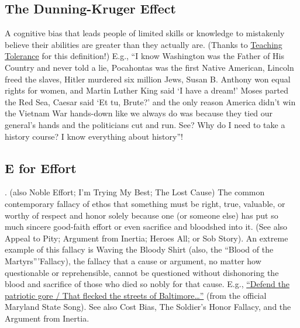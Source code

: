 \documentclass[10pt,a4paper,british]{article}
\begin{document}
\begin{multicols}{2}
    \subsection{The Dunning{-}Kruger Effect} A cognitive bias that leads people of limited skills or knowledge to mistakenly believe their abilities are greater than they actually are. (Thanks to \href{https://www.tolerance.org/magazine/fall-2017/speaking-of-digital-literacy}{Teaching Tolerance} for this definition!)  E.g., ``I know Washington was the Father of His Country and never told a lie, Pocahontas was the first Native American, Lincoln freed the slaves, Hitler murdered six million Jews, Susan B. Anthony won equal rights for women, and Martin Luther King said `I have a dream!'  Moses parted the Red Sea, Caesar said `Et tu, Brute?' and the only reason America didn't win the Vietnam War hands{-}down like we always do was because they tied our general's hands and the politicians cut and run. See?  Why do I need to take a history course? I know everything about history''!  

    \subsection{E for Effort}. (also Noble Effort; I'm Trying My Best; The Lost Cause) The common contemporary fallacy of ethos that something must be right, true, valuable, or worthy of respect and honor solely because one (or someone else) has put so much sincere good{-}faith effort or even sacrifice and bloodshed into it. (See also Appeal to Pity; Argument from Inertia; Heroes All; or Sob Story).  An extreme example of this fallacy is Waving the Bloody Shirt (also, the ``Blood of the Martyrs'''Fallacy), the fallacy that a cause or argument, no matter how questionable or reprehensible, cannot be questioned without dishonoring the blood and sacrifice of those who died so nobly for that cause. E.g., \href{https://en.wikipedia.org/wiki/Maryland,_My_Maryland#Lyrics}{``Defend the patriotic gore / That flecked the streets of Baltimore\ldots''} (from the official Maryland State Song). See also Cost Bias, The Soldier's Honor Fallacy, and the Argument from Inertia.  


\end{multicols}
\end{document}
